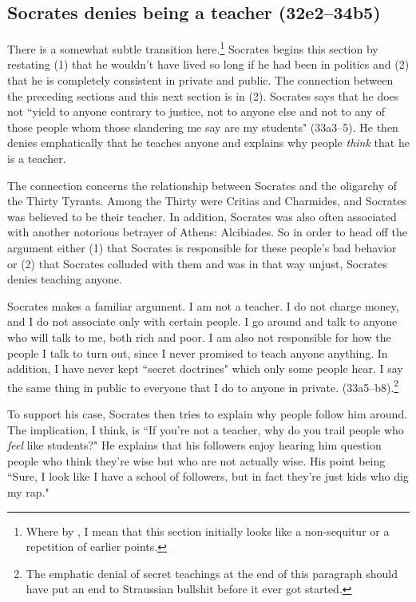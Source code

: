 \documentclass[11pt]{article}
\begin{document}

\subsection{Socrates denies being a teacher (32e2--34b5)}

There is a somewhat subtle transition here.\footnote{Where by
, I mean that this section initially looks like a non-sequitur
or a repetition of earlier points.}  Socrates begins this section by
restating (1) that he wouldn't have lived so long if he had been in
politics and (2) that he is completely consistent in private and public.
The connection between the preceding sections and this next section is in
(2).  Socrates says that he does not ``yield to anyone contrary to justice,
not to anyone else and not to any of those people whom those slandering me
say are my students" (33a3--5).  He then denies emphatically that he
teaches anyone and explains why people \emph{think} that he is a teacher.

The connection concerns the relationship between Socrates and the oligarchy
of the Thirty Tyrants.  Among the Thirty were Critias and Charmides, and
Socrates was believed to be their teacher.  In addition, Socrates was also
often associated with another notorious betrayer of Athens: Alcibiades.  So
in order to head off the argument either (1) that Socrates is responsible
for these people's bad behavior or (2) that Socrates colluded with them and
was in that way unjust, Socrates denies teaching anyone.

Socrates makes a familiar argument.  I am not a teacher.  I do not charge
money, and I do not associate only with certain people.  I go around and
talk to anyone who will talk to me, both rich and poor.  I am also not
responsible for how the people I talk to turn out, since I never promised
to teach anyone anything.  In addition, I have never kept ``secret
doctrines" which only some people hear.  I say the same thing in public to
everyone that I do to anyone in private. (33a5--b8).\footnote{The emphatic
denial of secret teachings at the end of this paragraph should have put an
end to Straussian bullshit before it ever got started.}

To support his case, Socrates then tries to explain why people follow him
around.  The implication, I think, is ``If you're not a teacher, why do you
trail people who \emph{feel} like students?"  He explains that his
followers enjoy hearing him question people who think they're wise but who
are not actually wise.  His point being ``Sure, I look like I have a school
of followers, but in fact they're just kids who dig my rap."
\end{document}
